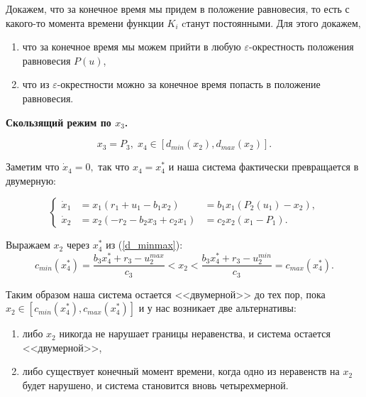 \documentclass[11pt]{article}
\newcommand\Ref[1]{(\ref{#1})}
\newcommand\beq{\begin{equation}}
\newcommand\eeq{\end{equation}}
\begin{document}
	Докажем, что за конечное время мы придем в положение равновесия, то есть с какого-то момента времени функции $K_i$ cтанут постоянными. Для этого докажем,
	\begin{enumerate}
		\item что за конечное время мы можем прийти в любую $\varepsilon$-окрестность положения равновесия $P(u)$,
		\item что из $\varepsilon$-окрестности можно за конечное время попасть в положение равновесия.
	\end{enumerate}


{\bf Скользящий режим по $x_3$.}

\beq
\label{d_minmax}
	x_3 = P_3, \; x_4 \in [d_{min}(x_2), d_{max}(x_2)].
\eeq

Заметим что $\dot x_4 = 0,$ так что $x_4 = x_4^*$ и наша система фактически превращается в двумерную:

$$
\left\{
\begin{aligned}
	\dot x_1 &= x_1(r_1 + u_1- b_1x_2) &= b_1x_1(P_2(u_1) - x_2), \\
	\dot x_2 &= x_2(-r_2 - b_2x_3 + c_2x_1) &= c_2x_2(x_1 - P_1).
\end{aligned}
\right.
$$

Выражаем $x_2$ через $x_4^*$ из \Ref{d_minmax}:
$$c_{min}(x_4^*) = \frac{b_3x_4^* + r_3 - u_2^{max}}{c_3} < x_2 < \frac{b_3x_4^* + r_3 - u_2^{min}}{c_3} = c_{max}(x_4^*).$$

Таким образом наша система остается <<двумерной>> до тех пор, пока $x_2 \in [c_{min}(x_4^*), c_{max}(x_4^*)]$ и у нас возникает две альтернативы:
\begin{enumerate}
	\item либо $x_2$ никогда не нарушает границы неравенства, и система остается <<двумерной>>,
	\item либо существует конечный момент времени, когда одно из неравенств на $x_2$ будет нарушено, и система становится вновь четырехмерной.
\end{enumerate}
\end{document}
